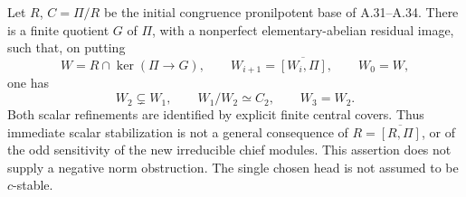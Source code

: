Let \(R\), \(C=\Pi/R\) be the initial congruence
pronilpotent base of A.31--A.34. There is a finite
quotient \(G\) of \(\Pi\), with a nonperfect
elementary-abelian residual image, such that, on putting
\[
 W=R\cap\ker(\Pi\to G),\qquad
 W_{i+1}=\overline{[W_i,\Pi]},\qquad W_0=W,
\]
one has
\[
 W_2\subsetneq W_1,\qquad W_1/W_2\simeq C_2,
 \qquad W_3=W_2.                                      \tag{A.51.1}
\]
Both scalar refinements are identified by explicit
finite central covers. Thus immediate scalar
stabilization is not a general consequence of
\(R=\overline{[R,\Pi]}\), or of the odd sensitivity
of the new irreducible chief modules.
This assertion does not supply a negative norm
obstruction. The single chosen head is not assumed
to be \(c\)-stable.

